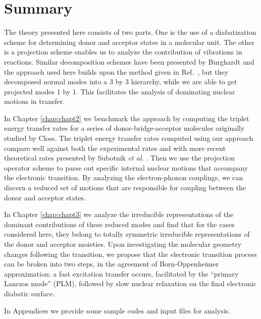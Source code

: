 \section{Summary}

The theory presented here consists of two parts. One is the use of a diabatization scheme for determining
donor and acceptor states in a molecular unit. The other is a projection scheme enables us to analyze the contribution of vibrations in reactions. Similar decomposition schemes have been presented by Burghardt
 \cite{gindensperger2006shortI,gindensperger2006shortII,cederbaum2005short}
 and the approach used here builds upon the method given in Ref.~\cite{pereverzev2009energy}, but they decomposed normal modes into a 3 by 3 hierarchy, while we are able to get projected modes 1 by 1. This facilitates the analysis of dominating nuclear motions in transfer.

In Chapter \ref{chap:chapt2} we benchmark the approach
by computing the  triplet energy transfer rates for a series of donor-bridge-acceptor molecules
originally studied by Closs\cite{miller1984intramolecular}.  The triplet energy transfer rates computed using our approach
compare well against both the experimental rates and with
more recent theoretical rates presented by Subotnik {\em et al.}
\cite{subotnik2008constructing,subotnik2009initial,subotnik2010predicting}.
Then we use the projection operator scheme
to parse out specific internal nuclear motions that accompany
the electronic transition.
 By analyzing the electron-phonon couplings, we can
discern a reduced set of motions that are responsible for coupling between the donor and
acceptor states.

In Chapter \ref{chap:chapt3} we analyze the irreducible
representations  of the dominant contributions of these reduced modes and find that for the cases considered here, they belong to totally symmetric irreducible representations  of
the donor and acceptor moieties. Upon investigating the molecular geometry changes following  the transition,   we propose that the electronic transition process can be
broken into two steps, in the agreement of Born-Oppenheimer approximation:  a fast excitation transfer occurs, facilitated by the ``primary Lanczos mode'' (PLM),
followed by slow nuclear relaxation on the final electronic diabatic surface.

In Appendices we provide some sample codes and input files for analysis.

